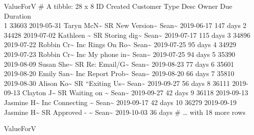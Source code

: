 \documentclass[]{article}
\begin{document}
\pagebreak
ValueForV \# A tibble: 28 x 8 ID Created Customer Type Desc Owner Due
Duration \\
1 33603 2019-05-31 Taryn McN\textasciitilde{} SR New
Version\textasciitilde{} Sean\textasciitilde{} 2019-06-17 147 days 2
34428 2019-07-02 Kathleen \textasciitilde{} SR Storing
dig\textasciitilde{} Sean\textasciitilde{} 2019-07-17 115 days 3 34896
2019-07-22 Robbin Cr\textasciitilde{} Inc Rings On Ro\textasciitilde{}
Sean\textasciitilde{} 2019-07-25 95 days 4 34929 2019-07-23 Robbin
Cr\textasciitilde{} Inc My phone in\textasciitilde{}
Sean\textasciitilde{} 2019-07-25 94 days 5 35390 2019-08-09 Susan
She\textasciitilde{} SR Re: Email/G\textasciitilde{}
Sean\textasciitilde{} 2019-08-23 77 days 6 35601 2019-08-20 Emily
San\textasciitilde{} Inc Report Prob\textasciitilde{}
Sean\textasciitilde{} 2019-08-20 66 days 7 35810 2019-08-30 Alison
Ko\textasciitilde{} SR ``Exiting Us\textasciitilde{}
Sean\textasciitilde{} 2019-09-27 56 days 8 36111 2019-09-13 Clayton
J\textasciitilde{} SR Waiting on \textasciitilde{} Sean\textasciitilde{}
2019-09-27 42 days 9 36118 2019-09-13 Jasmine H\textasciitilde{} Inc
Connecting \textasciitilde{} Sean\textasciitilde{} 2019-09-17 42 days 10
36279 2019-09-19 Jasmine H\textasciitilde{} SR Approved -
\textasciitilde{} Sean\textasciitilde{} 2019-10-03 36 days \# \ldots{}
with 18 more rows

\pagebreak
ValueForV
\end{document}
